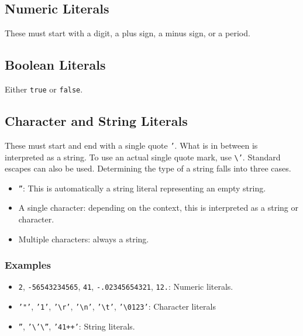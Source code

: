 \documentclass{article}
\newcommand{\code}[1]{\texttt{#1}}
\begin{document}
\subsection{Numeric Literals}
These must start with a digit, a plus sign, a minus sign, or a period.
\subsection{Boolean Literals}
Either \code{true} or \code{false}.
\subsection{Character and String Literals}
These must start and end with a single quote \code{'}. What is in between is interpreted as a string. To use an actual single quote mark, use \code{\textbackslash'}. Standard escapes can also be used. Determining the type of a string falls into three cases.
\begin{itemize}
\item \code{''}: This is automatically a string literal representing an empty string.
\item A single character: depending on the context, this is interpreted as a string or character.
\item Multiple characters: always a string.
\end{itemize}
\subsubsection{Examples}
\begin{itemize}
\item \code{2}, \code{-56543234565}, \code{41}, \code{-.02345654321}, \code{12.}: Numeric literals.
\item \code{'"'}, \code{'1'}, \code{'\textbackslash{}r'}, \code{'\textbackslash{}n'}, \code{'\textbackslash{}t'}, \code{'\textbackslash{}0123'}: Character literals
\item \code{''}, \code{'\textbackslash'\textbackslash''}, \code{'41++'}: String literals.
\end{itemize}
\end{document}
